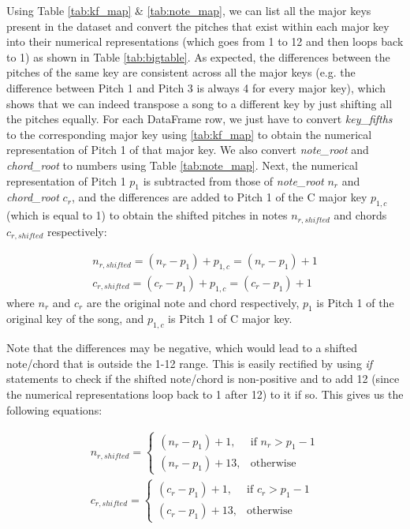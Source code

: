 Using Table \cref{tab:kf_map} \& \cref{tab:note_map}, we can list all the major keys present in the dataset and convert the pitches that exist within each major key into their numerical representations (which goes from 1 to 12 and then loops back to 1) as shown in Table \cref{tab:bigtable}. As expected, the differences between the pitches of the same key are consistent across all the major keys (e.g. the difference between Pitch 1 and Pitch 3 is always 4 for every major key), which shows that we can indeed transpose a song to a different key by just shifting all the pitches equally. For each DataFrame row, we just have to convert \emph{key\_fifths} to the corresponding major key using \cref{tab:kf_map} to obtain the numerical representation of Pitch 1 of that major key. We also convert \emph{note\_root} and \emph{chord\_root} to numbers using Table \cref{tab:note_map}. Next, the numerical representation of Pitch 1 $p_1$ is subtracted from those of \emph{note\_root} $n_r$ and \emph{chord\_root} $c_r$, and the differences are added to Pitch 1 of the C major key $p_{1,c}$ (which is equal to 1) to obtain the shifted pitches in notes $n_{r,shifted}$ and chords $c_{r,shifted}$ respectively: 

\begin{align} 
    \label{shift note 1}
    n_{r,shifted} = (n_r-p_1)+p_{1,c} = (n_r-p_1)+1\\
    \label{shift chord 2}
    c_{r,shifted} =(c_r-p_1)+p_{1,c} = (c_r-p_1)+1
\end{align}
where $n_r$ and $c_r$ are the original note and chord respectively, $p_1$ is Pitch 1 of the original key of the song, and $p_{1,c}$ is Pitch 1 of C major key.

Note that the differences may be negative, which would lead to a shifted note/chord that is outside the 1-12 range. This is easily rectified by using \emph{if} statements to check if the shifted note/chord is non-positive and to add 12 (since the numerical representations loop back to 1 after 12) to it if so. This gives us the following equations:

\begin{align}
    \label{shift note 2}
    n_{r,shifted}= 
\begin{cases}
    (n_r-p_1)+1,& \text{if } n_r > p_1-1\\
    (n_r-p_1)+13,              & \text{otherwise}
\end{cases}\\
c_{r,shifted}= 
\begin{cases}
    (c_r-p_1)+1,& \text{if } c_r > p_1-1\\
    (c_r-p_1)+13,              & \text{otherwise}
\end{cases}
\end{align}

